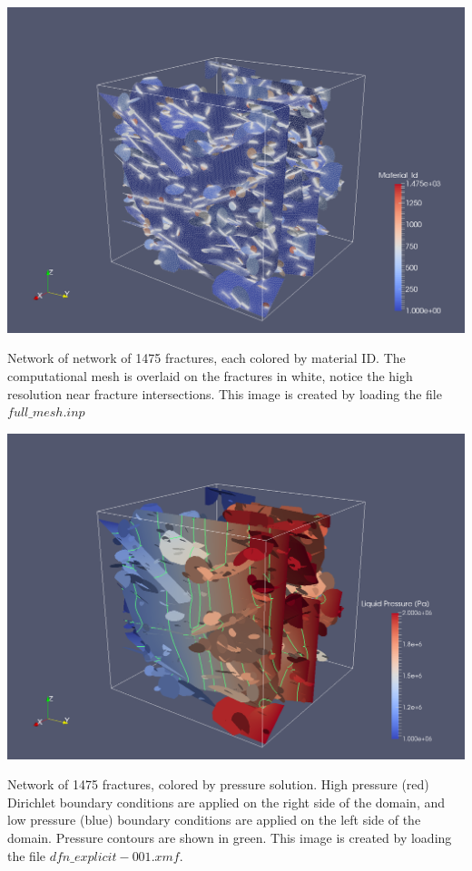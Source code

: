 \documentclass{article}
\begin{document}
\begin{center}
\includegraphics[width=0.75\linewidth]{figs/test_1000_fracture_mesh.png}\\
\end{center}
Network of network of 1475 fractures, each colored by material ID. 
The computational mesh is overlaid on the fractures in white, notice the high resolution near fracture intersections.  
This image is created by loading the file $full\_mesh.inp$

\begin{center}
\includegraphics[width=0.75\linewidth]{figs/test_1000_fracture_pressure.png}\\
\end{center}
Network of 1475 fractures,  colored by pressure solution.  
High pressure (red) Dirichlet boundary conditions are applied on the right side of the domain, and low pressure (blue)  boundary conditions are applied on the left side of the domain. 
Pressure contours are shown in green. 
This image is created by loading the file $dfn\_explicit-001.xmf$.
\end{document}
